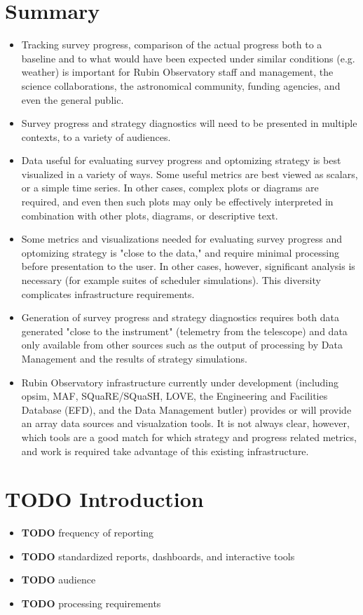 
\section{Summary}
\label{sec:orgf3cb405}
\begin{itemize}
\item Tracking survey progress, comparison of the actual progress both to a baseline and to what would have been expected under similar conditions (e.g. weather) is important for Rubin Observatory staff and management, the science collaborations, the astronomical community, funding agencies, and even the general public.
\item Survey progress and strategy diagnostics will need to be presented in multiple contexts, to a variety of audiences.
\item Data useful for evaluating survey progress and optomizing strategy is best visualized in a variety of ways. Some useful metrics are best viewed as scalars, or a simple time series. In other cases, complex plots or diagrams are required, and even then such plots may only be effectively interpreted in combination with other plots, diagrams, or descriptive text.
\item Some metrics and visualizations needed for evaluating survey progress and optomizing strategy is "close to the data," and require minimal processing before presentation to the user. In other cases, however, significant analysis is necessary (for example suites of scheduler simulations). This diversity complicates infrastructure requirements.
\item Generation of survey progress and strategy diagnostics requires both data generated "close to the instrument" (telemetry from the telescope) and data only available from other sources such as the output of processing by Data Management and the results of strategy simulations.
\item Rubin Observatory infrastructure currently under development (including opsim, MAF, SQuaRE/SQuaSH, LOVE, the Engineering and Facilities Database (EFD), and the Data Management butler) provides or will provide an array data sources and visualzation tools. It is not always clear, however, which tools are a good match for which strategy and progress related metrics, and work is required take advantage of this existing infrastructure.
\end{itemize}
\section{{\bfseries\sffamily TODO} Introduction}
\label{sec:org74a5558}
\begin{itemize}
\item {\bfseries\sffamily TODO} frequency of reporting
\label{sec:org6b6746f}
\item {\bfseries\sffamily TODO} standardized reports, dashboards, and interactive tools
\label{sec:org394fa27}
\item {\bfseries\sffamily TODO} audience
\label{sec:orgaa043fd}
\item {\bfseries\sffamily TODO} processing requirements
\label{sec:org192fb03}
\end{itemize}
